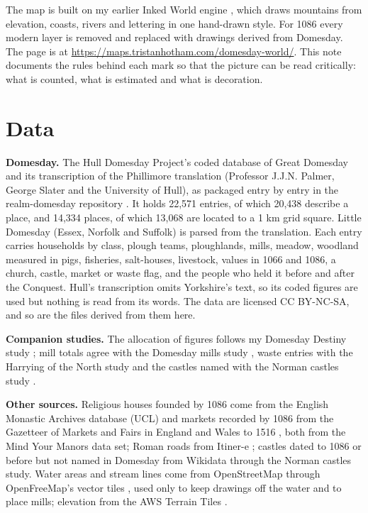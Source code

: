 \documentclass[11pt,a4paper]{article}
\begin{document}
The map is built on my earlier Inked World engine \cite{inkmap}, which draws mountains from elevation, coasts, rivers and lettering in one hand-drawn style. For 1086 every modern layer is removed and replaced with drawings derived from Domesday. The page is at \url{https://maps.tristanhotham.com/domesday-world/}. This note documents the rules behind each mark so that the picture can be read critically: what is counted, what is estimated and what is decoration.

\section{Data}
\textbf{Domesday.} The Hull Domesday Project's coded database of Great Domesday and its transcription of the Phillimore translation (Professor J.J.N. Palmer, George Slater and the University of Hull), as packaged entry by entry in the realm-domesday repository \cite{realm}. It holds 22,571 entries, of which 20,438 describe a place, and 14,334 places, of which 13,068 are located to a 1 km grid square. Little Domesday (Essex, Norfolk and Suffolk) is parsed from the translation. Each entry carries households by class, plough teams, ploughlands, mills, meadow, woodland measured in pigs, fisheries, salt-houses, livestock, values in 1066 and 1086, a church, castle, market or waste flag, and the people who held it before and after the Conquest. Hull's transcription omits Yorkshire's text, so its coded figures are used but nothing is read from its words. The data are licensed CC BY-NC-SA, and so are the files derived from them here.

\textbf{Companion studies.} The allocation of figures follows my Domesday Destiny study \cite{destiny}; mill totals agree with the Domesday mills study \cite{mills}, waste entries with the Harrying of the North study \cite{harrying} and the castles named with the Norman castles study \cite{castles}.

\textbf{Other sources.} Religious houses founded by 1086 come from the English Monastic Archives database (UCL) and markets recorded by 1086 from the Gazetteer of Markets and Fairs in England and Wales to 1516 \cite{markets}, both from the Mind Your Manors data set; Roman roads from Itiner-e \cite{itinere}; castles dated to 1086 or before but not named in Domesday from Wikidata through the Norman castles study. Water areas and stream lines come from OpenStreetMap through OpenFreeMap's vector tiles \cite{osm}, used only to keep drawings off the water and to place mills; elevation from the AWS Terrain Tiles \cite{terrain}.
\end{document}
